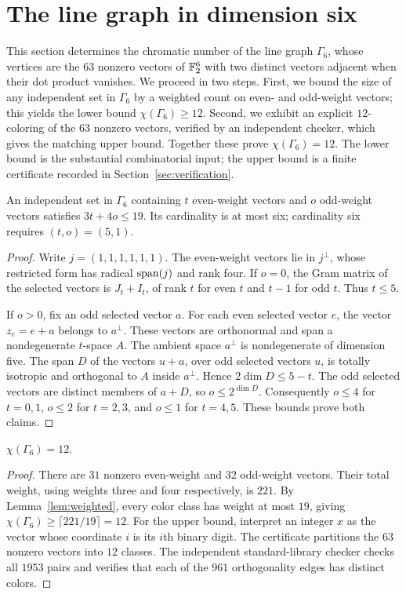 \section{The line graph in dimension six}
\label{sec:line}
This section determines the chromatic number of the line graph
\(\Gamma_6\), whose vertices are the \(63\) nonzero vectors of
\(\mathbb F_2^6\) with two distinct vectors adjacent when their dot product
vanishes.  We proceed in two steps.  First, we bound the size of any
independent set in \(\Gamma_6\) by a weighted count on even- and
odd-weight vectors; this yields the lower bound
\(\chi(\Gamma_6)\ge 12\).  Second, we exhibit an explicit
\(12\)-coloring of the \(63\) nonzero vectors, verified by an
independent checker, which gives the matching upper bound.  Together
these prove \(\chi(\Gamma_6)=12\).  The lower bound is the
substantial combinatorial input; the upper bound is a finite
certificate recorded in Section~\ref{sec:verification}.
\begin{lemma}\label{lem:weighted}
An independent set in $\Gamma_6$ containing $t$ even-weight vectors and $o$
odd-weight vectors satisfies $3t+4o\leq19$. Its cardinality is at most six;
cardinality six requires $(t,o)=(5,1)$.
\end{lemma}
\begin{proof}
Write $j=(1,1,1,1,1,1)$. The even-weight vectors lie in $j^\perp$, whose
restricted form has radical $\operatorname{span}(j)$ and rank four. If $o=0$, the Gram
matrix of the selected vectors is $J_t+I_t$, of rank $t$ for even $t$ and
$t-1$ for odd $t$. Thus $t\leq5$.

If $o>0$, fix an odd selected vector $a$. For each even selected vector $e$,
the vector $z_e=e+a$ belongs to $a^\perp$. These vectors are orthonormal and
span a nondegenerate $t$-space $A$. The ambient space $a^\perp$ is
nondegenerate of dimension five. The span $D$ of the vectors $u+a$, over odd
selected vectors $u$, is totally isotropic and orthogonal to $A$ inside
$a^\perp$. Hence $2\dim D\leq5-t$. The odd selected vectors are distinct
members of $a+D$, so $o\leq2^{\dim D}$. Consequently $o\leq4$ for $t=0,1$,
$o\leq2$ for $t=2,3$, and $o\leq1$ for $t=4,5$. These bounds prove both claims.
\end{proof}

\begin{theorem}\label{thm:lines}
$\chi(\Gamma_6)=12$.
\end{theorem}
\begin{proof}
There are $31$ nonzero even-weight and $32$ odd-weight vectors. Their total
weight, using weights three and four respectively, is $221$. By
Lemma~\ref{lem:weighted}, every color class has weight at most $19$, giving
$\chi(\Gamma_6)\geq\lceil221/19\rceil=12$.
For the upper bound, interpret an integer $x$ as the vector whose coordinate
$i$ is its $i$th binary digit. The certificate
 partitions the $63$ nonzero vectors
into $12$ classes. The independent standard-library checker
 checks all $1953$ pairs and
verifies that each of the $961$ orthogonality edges has distinct colors.
\end{proof}

